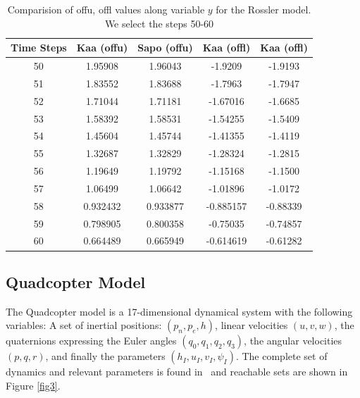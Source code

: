 \documentclass[EPiC]{easychair}
\begin{document}
\begin{table}[hbt!]
\centering
\begin{tabular}{|c c c c c|}
    \hline
    {\bf Time Steps } & {\bf Kaa (offu) } & {\bf Sapo (offu) } & {\bf Kaa (offl) } & {\bf Kaa (offl) }  \\
    \hline
    50 & 1.95908 & 1.96043  & -1.9209 & -1.9193 \\

    51 & 1.83552 & 1.83688  & -1.7963 & -1.7947 \\
    
    52 & 1.71044 & 1.71181  & -1.67016 & -1.6685 \\
  
    53 & 1.58392 & 1.58531  & -1.54255 & -1.5409 \\
   
    54 & 1.45604 & 1.45744  & -1.41355 & -1.4119 \\
 
    55 & 1.32687 & 1.32829  & -1.28324 & -1.2815\\

    56 & 1.19649 & 1.19792  & -1.15168 & -1.1500\\

    57 & 1.06499 & 1.06642  & -1.01896 & -1.0172 \\
 
    58 & 0.932432 & 0.933877 & -0.885157 & -0.88339 \\
    
    59 & 0.798905 & 0.800358  & -0.75035 &  -0.74857 \\
  
    60 & 0.664489 & 0.665949  & -0.614619 & -0.61282\\
    \hline
\end{tabular}
\caption{Comparision of offu, offl values along variable $y$ for the Rossler model. We select the steps 50-60}
\label{val2}
\end{table}

\subsection{Quadcopter Model}
\noindent The Quadcopter model is a 17-dimensional dynamical system with the following variables:
A set of inertial positions: $(p_n,p_e,h)$, linear velocities $(u,v,w)$, the quaternions expressing the Euler angles $(q_0,q_1,q_2,q_3)$, the angular velocities $(p,q,r)$, and finally the parameters $(h_I, u_I, v_I, \psi_I)$. The complete set of dynamics and relevant parameters is found in~\cite{dreossi2017reachability} and reachable sets are shown in Figure \ref{fig3}.
\end{document}
